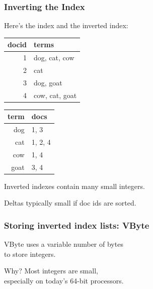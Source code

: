 \begin{frame}
\frametitle{Inverting the Index}

\begin{changemargin}{2cm}
Here's the index and the inverted index:
\begin{center}
\begin{tabular}{r|l}
docid & terms \\ \hline
1 & dog, cat, cow\\
2 & cat\\
3 & dog, goat\\
4 & cow, cat, goat\\
\end{tabular} \hspace*{2em}
\begin{tabular}{r|l}
term & docs \\ \hline
dog & 1, 3 \\
cat & 1, 2, 4 \\
cow & 1, 4 \\
goat & 3, 4
\end{tabular}
\end{center}

Inverted indexes contain many small integers.

Deltas typically small if doc ids are sorted.
\end{changemargin}

\end{frame}


\begin{frame}
\frametitle{Storing inverted index lists: VByte}

\begin{changemargin}{2cm}
\vspace*{-2em}
VByte uses a variable number of bytes\\
to store integers.  

Why? Most integers are
small,\\
especially on today's 64-bit processors.
\end{changemargin}
\end{frame}


